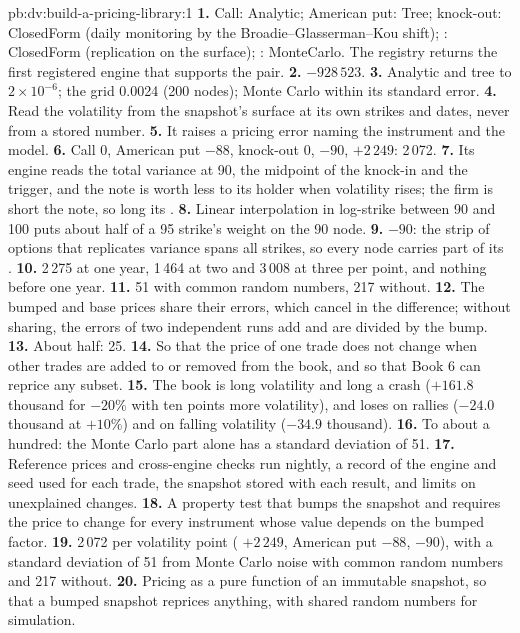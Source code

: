 \begin{solution}{pb:dv:build-a-pricing-library:1}
\textbf{1.} Call: Analytic; American put: Tree; knock-out: ClosedForm (daily monitoring by the Broadie--Glasserman--Kou shift); : ClosedForm
(replication on the surface); : MonteCarlo. The registry returns the first registered engine that supports the pair.
\textbf{2.} $-928\,523$.
\textbf{3.} Analytic and tree to $2\times10^{-6}$; the grid 0.0024 (200 nodes); Monte Carlo within its standard error.
\textbf{4.} Read the volatility from the snapshot's surface at its own strikes and dates, never from a stored number.
\textbf{5.} It raises a pricing error naming the instrument and the model.
\textbf{6.} Call 0, American put $-88$, knock-out 0,  $-90$,  $+2\,249$: 2\,072.
\textbf{7.} Its engine reads the total variance at 90, the midpoint of the knock-in and the trigger, and the note is worth less to its holder when volatility
rises; the firm is short the note, so long its .
\textbf{8.} Linear interpolation in log-strike between 90 and 100 puts about half of a 95 strike's weight on the 90 node.
\textbf{9.} $-90$: the strip of options that replicates variance spans all strikes, so every node carries part of its .
\textbf{10.} 2\,275 at one year, 1\,464 at two and 3\,008 at three per point, and nothing before one year.
\textbf{11.} 51 with common random numbers, 217 without.
\textbf{12.} The bumped and base prices share their errors, which cancel in the difference; without sharing, the errors of two independent runs add and are divided
by the bump.
\textbf{13.} About half: 25.
\textbf{14.} So that the price of one trade does not change when other trades are added to or removed from the book, and so that Book 6 can reprice any subset.
\textbf{15.} The book is long volatility and long a crash ($+161.8$ thousand for $-20\%$ with ten points more volatility), and loses on rallies ($-24.0$ thousand at
$+10\%$) and on falling volatility ($-34.9$ thousand).
\textbf{16.} To about a hundred: the Monte Carlo part alone has a standard deviation of 51.
\textbf{17.} Reference prices and cross-engine checks run nightly, a record of the engine and seed used for each trade, the snapshot stored with each result, and
limits on unexplained changes.
\textbf{18.} A property test that bumps the snapshot and requires the price to change for every instrument whose value depends on the bumped factor.
\textbf{19.} 2\,072 per volatility point ( $+2\,249$, American put $-88$,  $-90$), with a standard deviation of 51 from Monte Carlo
noise with common random numbers and 217 without.
\textbf{20.} Pricing as a pure function of an immutable snapshot, so that a bumped snapshot reprices anything, with shared random numbers for simulation.
\end{solution}

